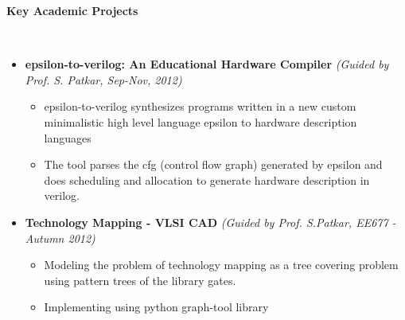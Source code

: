 \documentclass[a4paper,11pt]{article}
\newcommand{\isep}{-2 pt}
\newcommand{\lsep}{-0.5cm}
\newcommand{\resheading}[1]{{\small \colorbox{mygrey}{\begin{minipage}{0.975\textwidth}{\textbf{#1 \vphantom{p\^{E}}}}\end{minipage}}}}
\begin{document}
\resheading{\textbf{\large Key Academic Projects}}\\[\lsep]
\begin{itemize}
    \item \textbf{ epsilon-to-verilog: An Educational Hardware Compiler} \hfill \emph{(Guided by Prof. S. Patkar, Sep-Nov, 2012) }  \\[-0.6cm]
    \begin{itemize} \itemsep \isep
        \item epsilon-to-verilog synthesizes programs written in a new custom minimalistic high level language epsilon to hardware description languages
        \item The tool parses the cfg (control flow graph) generated by epsilon and does scheduling and allocation to generate hardware description in verilog.
   \end{itemize}
    \item \textbf{Technology Mapping - VLSI CAD} \hfill \emph{(Guided by Prof. S.Patkar, EE677 - Autumn 2012)} \\[-0.6cm]
    \begin{itemize} \itemsep \isep
        \item Modeling the problem of technology mapping as a tree covering problem using pattern trees of the library gates.
        \item Implementing using python graph-tool library
    \end{itemize}


\end{itemize}
\end{document}
